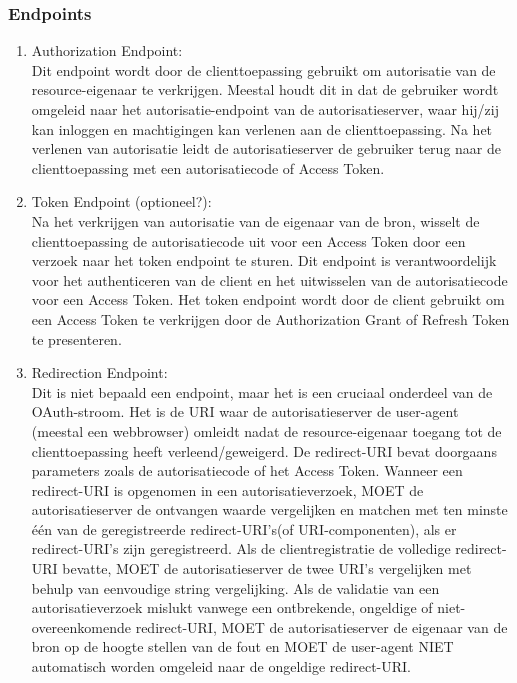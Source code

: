 \subsubsection{Endpoints}%
\label{subsubsec:endpoints}
\begin{enumerate}[label=\textbf{-}]
    \item Authorization Endpoint: \\
    Dit endpoint wordt door de clienttoepassing gebruikt om autorisatie van de resource-eigenaar te verkrijgen. Meestal houdt dit in dat de gebruiker wordt omgeleid naar het autorisatie-endpoint van de autorisatieserver, waar hij/zij kan inloggen en machtigingen kan verlenen aan de clienttoepassing. Na het verlenen van autorisatie leidt de autorisatieserver de gebruiker terug naar de clienttoepassing met een autorisatiecode of Access Token.
  
    \item Token Endpoint (optioneel?): \\
    Na het verkrijgen van autorisatie van de eigenaar van de bron, wisselt de clienttoepassing de autorisatiecode uit voor een Access Token door een verzoek naar het token endpoint te sturen. Dit endpoint is verantwoordelijk voor het authenticeren van de client en het uitwisselen van de autorisatiecode voor een Access Token. Het token endpoint wordt door de client gebruikt om een Access Token te verkrijgen door de Authorization Grant of Refresh Token te presenteren.
  
    \item Redirection Endpoint: \\
    Dit is niet bepaald een endpoint, maar het is een cruciaal onderdeel van de OAuth-stroom. Het is de URI waar de autorisatieserver de user-agent (meestal een webbrowser) omleidt nadat de resource-eigenaar toegang tot de clienttoepassing heeft verleend/geweigerd. De redirect-URI bevat doorgaans parameters zoals de autorisatiecode of het Access Token. Wanneer een redirect-URI is opgenomen in een autorisatieverzoek, MOET de autorisatieserver de ontvangen waarde vergelijken en matchen met ten minste één van de geregistreerde redirect-URI's(of URI-componenten), als er redirect-URI's zijn geregistreerd. Als de clientregistratie de volledige redirect-URI bevatte, MOET de autorisatieserver de twee URI's vergelijken met behulp van eenvoudige string vergelijking. Als de validatie van een autorisatieverzoek mislukt vanwege een ontbrekende, ongeldige of niet-overeenkomende redirect-URI, MOET de autorisatieserver de eigenaar van de bron op de hoogte stellen van de fout en MOET de user-agent NIET automatisch worden omgeleid naar de ongeldige redirect-URI.
  \end{enumerate}

